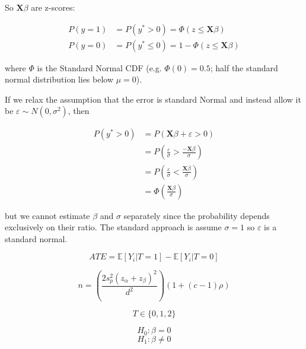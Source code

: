 \documentclass{article}
\begin{document}
So $\mathbf{X}\beta$ are z-scores:

\begin{align*}
P(y = 1) &= P(y^* > 0) = \Phi(z \leq \mathbf{X}\beta)\\
P(y = 0) &= P(y^* \leq 0) = 1 - \Phi(z \leq \mathbf{X}\beta)
\end{align*}

where $\Phi$ is the Standard Normal CDF (e.g. $\Phi(0) = 0.5$; half the standard normal distribution lies below $\mu = 0$). 

If we relax the assumption that the error is standard Normal and instead allow it be $\varepsilon \sim N(0, \sigma^2)$, then 

\begin{align*}
P(y^* > 0)  &= P(\mathbf{X}\beta + \varepsilon > 0)\\
            &= P(\frac{\varepsilon}{\sigma} > \frac{-\mathbf{X}\beta}{\sigma})\\
            &= P(\frac{\varepsilon}{\sigma} < \frac{\mathbf{X}\beta}{\sigma}) \\
            &= \Phi(\frac{\mathbf{X}\beta}{\sigma})
\end{align*}

but we cannot estimate $\beta$ and $\sigma$ separately since the probability depends exclusively on their ratio. The standard approach is assume $\sigma = 1$ so $\varepsilon$ is a standard normal. 


\begin{equation}
ATE = \mathbb{E}[Y_i|T = 1] - \mathbb{E}[Y_i|T = 0] 
\end{equation}

\begin{equation}
n = (\frac{2s^2_p(z_{\alpha} + z_{\beta})^2}{d^2})(1+(c-1)\rho)
\end{equation}

$$
T \in \{0,1,2\}
$$

$$
H_0: \beta = 0
$$
$$
H_1: \beta \neq 0 
$$
\end{document}
